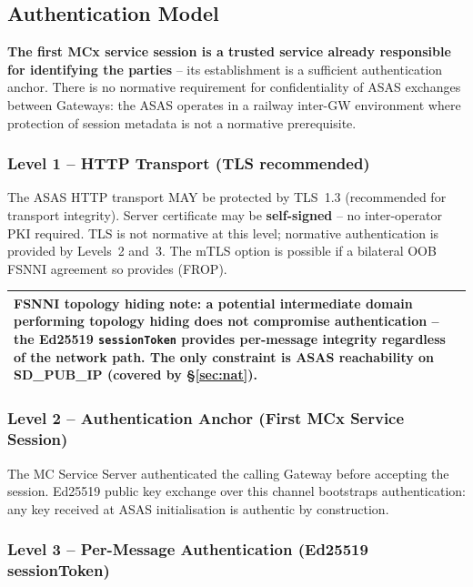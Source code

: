 \documentclass[11pt,a4paper]{article}
\newenvironment{notebox}{%
  \begin{center}\begin{tabular}{|p{0.93\textwidth}|}\hline\rowcolor{noteblue}
}{\\\hline\end{tabular}\end{center}}
\begin{document}
\subsection{Authentication Model}
\label{sec:trust}

\textbf{The first MCx service session is a trusted service already responsible for
identifying the parties} -- its establishment is a sufficient authentication anchor.
There is no normative requirement for confidentiality of ASAS exchanges between
Gateways: the ASAS operates in a railway inter-GW environment where protection of
session metadata is not a normative prerequisite.

\subsubsection*{Level 1 -- HTTP Transport (TLS recommended)}

The ASAS HTTP transport MAY be protected by TLS~1.3 (recommended for transport
integrity). Server certificate may be \textbf{self-signed} -- no inter-operator PKI
required. TLS is not normative at this level; normative authentication is provided
by Levels~2 and~3. The mTLS option is possible if a bilateral OOB FSNNI agreement
so provides (FROP).

\begin{notebox}
  \textbf{FSNNI topology hiding note}: a potential intermediate domain performing
  topology hiding does not compromise authentication -- the Ed25519
  \texttt{sessionToken} provides per-message integrity regardless of the network
  path. The only constraint is ASAS reachability on SD\_PUB\_IP
  (covered by §\ref{sec:nat}).
\end{notebox}

\subsubsection*{Level 2 -- Authentication Anchor (First MCx Service Session)}

The MC Service Server authenticated the calling Gateway before accepting the session.
Ed25519 public key exchange over this channel bootstraps authentication: any key
received at ASAS initialisation is authentic by construction.

\subsubsection*{Level 3 -- Per-Message Authentication (Ed25519 sessionToken)}
\end{document}
